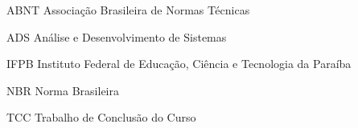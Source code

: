 %
%

\begin{siglas}
	\setlength{\baselineskip}{0.7\baselineskip}
	
    \item[ABNT] Associação Brasileira de Normas Técnicas
    \item[ADS] Análise e Desenvolvimento de Sistemas
    \item[IFPB] Instituto Federal de Educação, Ciência e Tecnologia da Paraíba
    \item[NBR] Norma Brasileira
    \item[TCC] Trabalho de Conclusão do Curso
    
\end{siglas}
